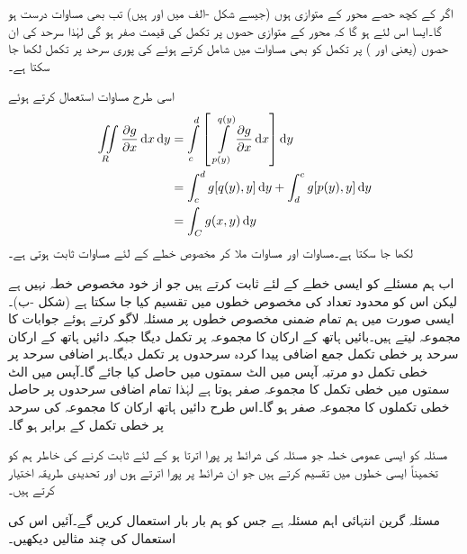 اگر  کے کچھ حصے  محور کے متوازی ہوں (جیسے شکل -الف میں  اور  ہیں) تب بھی  مساوات  درست ہو گا۔ایسا اس لئے ہو گا کہ  محور کے متوازی حصوں پر تکمل کی قیمت صفر ہو گی لہٰذا سرحد کی ان حصوں (یعنی  اور   ) پر تکمل  کو بھی مساوات  میں شامل کرتے ہوئے  کی پوری سرحد پر تکمل لکھا جا سکتا ہے۔

اسی طرح مساوات  استعمال کرتے ہوئے
\begin{gather}
\begin{aligned}\label{مساوات_خطی_تکمل_مسئلہ_گرین_ثبوت_ت}
\iint\limits_R \frac{\partial g}{\partial x}\dif x\dif y&=\int\limits_c^d \left[\,\,\int\limits_{p(y)}^{q(y)}\frac{\partial g}{\partial x}\dif x\right]\dif y\\
&=\int_c^d g[q(y),y]\dif y+\int_d^c g[p(y),y]\dif y\\
&=\int_C g(x,y)\dif y
\end{aligned}
\end{gather}
لکھا جا سکتا ہے۔مساوات  اور مساوات   ملا کر مخصوص خطے کے لئے مساوات  ثابت ہوتی ہے۔

اب ہم مسئلے کو ایسی خطے کے لئے ثابت کرتے ہیں جو از خود مخصوص خطہ نہیں ہے لیکن اس کو محدود تعداد کی مخصوص خطوں میں تقسیم کیا جا سکتا ہے (شکل -ب)۔ایسی صورت میں ہم تمام ضمنی مخصوص خطوں پر مسئلہ لاگو کرتے ہوئے جوابات کا مجموعہ لیتے ہیں۔بائیں ہاتھ کے ارکان کا مجموعہ   پر تکمل دیگا جبکہ دائیں ہاتھ کے ارکان سرحد  پر خطی تکمل جمع اضافی پیدا کردہ سرحدوں پر تکمل دیگا۔ہر اضافی سرحد پر خطی تکمل دو مرتبہ آپس میں الٹ سمتوں میں حاصل کیا جائے گا۔آپس میں الٹ سمتوں میں خطی تکمل کا مجموعہ صفر ہوتا ہے لہٰذا تمام اضافی سرحدوں پر حاصل خطی تکملوں کا مجموعہ صفر ہو گا۔اس طرح دائیں ہاتھ ارکان کا مجموعہ  کی سرحد  پر خطی تکمل کے برابر ہو گا۔ 

مسئلہ کو ایسی عمومی خطہ  جو مسئلہ کی شرائط پر پورا اترتا ہو کے  لئے ثابت کرنے کی خاطر ہم  کو تخمیناً ایسی خطوں میں تقسیم کرتے ہیں جو ان شرائط پر پورا اترتے ہوں اور تحدیدی طریقہ اختیار کرتے ہیں۔ 

مسئلہ گرین انتہائی اہم مسئلہ ہے جس کو ہم بار بار استعمال کریں گے۔آئیں اس کی استعمال کی چند مثالیں دیکھیں۔

